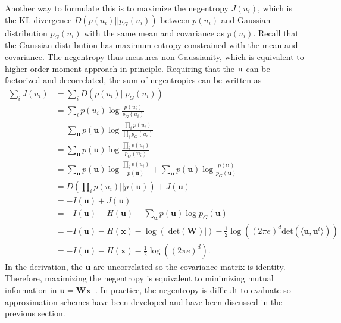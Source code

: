 \documentclass[aps,prl,preprint,superscriptaddress]{revtex4-2}
\begin{document}
Another way to formulate this is to maximize the negentropy $J(u_{i})$, which is the KL divergence $D(p(u_{i})||p_{G}(u_{i}))$ between $p(u_{i})$ and Gaussian distribution $p_{G}(u_{i})$ with the same mean and covariance as $p(u_{i})$. Recall that the Gaussian distribution has maximum entropy constrained with the mean and covariance. The negentropy thus measures non-Gaussianity, which is equivalent to higher order moment approach in principle. Requiring that the $\bf{u}$ can be factorized and decorrelated, the sum of negentropies can be written as
\begin{align}
\sum_{i}J(u_{i}) &= \sum_{i}D(p(u_{i})||p_{G}(u_{i})) \\
&= \sum_{i}p(u_{i})\log\frac{p(u_{i})}{p_{G}(u_{i})} \\
&= \sum_{\mathbf{u}}p(\mathbf{u}) \log\frac{\prod_{i}p(u_{i})}{\prod_{i}p_{G}(u_{i})} \\
&= \sum_{\mathbf{u}}p(\mathbf{u}) \log\frac{\prod_{i}p(u_{i})}{p_{G}(\mathbf{u}_{i})} \\
&= \sum_{\mathbf{u}}p(\mathbf{u}) \log\frac{\prod_{i}p(u_{i})}{p(\mathbf{u})} + \sum_{\mathbf{u}}p(\mathbf{u})\log\frac{p(\mathbf{u})}{p_{G}(\mathbf{u})} \\
&= D \left (\prod_{i}p(u_{i})||p(\mathbf{u}) \right) + J(\mathbf{u}) \\
&= -I(\mathbf{u}) + J(\mathbf{u}) \\
& = -I(\mathbf{u}) - H(\mathbf{u}) - \sum_{\mathbf{u}}p(\mathbf{u})\log p_{G}(\mathbf{u}) \\
& = -I(\mathbf{u}) - H(\mathbf{x}) - \log(|\mathrm{det}(\mathbf{W})|) - \frac{1}{2}\log((2\pi e)^{d} \mathrm{det}(\langle \mathbf{u}, \mathbf{u}^{t} \rangle))\\
&= -I(\mathbf{u}) - H(\mathbf{x}) - \frac{1}{2}\log((2\pi e)^{d}).
\end{align} In the derivation, the $\mathbf{u}$ are uncorrelated so the covariance matrix is identity. Therefore, maximizing the negentropy is equivalent to minimizing mutual information in $\mathbf{u} = \mathbf{W}\mathbf{x}$~\cite{lee1998independent}.
In practice, the negentropy is difficult to evaluate so approximation schemes have been developed and have been discussed in the previous section.
\end{document}
